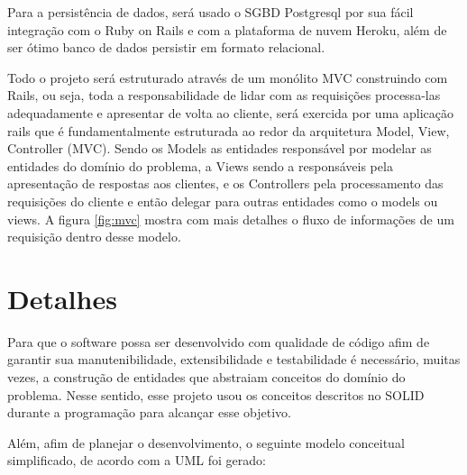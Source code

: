 Para a persistência de dados, será usado o SGBD Postgresql \cite{postgresql} por sua fácil integração com o Ruby on Rails e com a plataforma de nuvem Heroku, além de ser ótimo banco de dados persistir em formato relacional.

Todo o projeto será estruturado através de um monólito MVC construindo com Rails, ou seja, toda a responsabilidade de lidar com as requisições processa-las adequadamente e apresentar de volta ao cliente, será exercida por uma aplicação rails que é fundamentalmente estruturada ao redor da arquitetura Model, View, Controller (MVC). Sendo os Models as entidades responsável por modelar as entidades do domínio do problema, a Views sendo a responsáveis pela apresentação de respostas aos clientes, e os Controllers pela processamento das requisições do cliente e então delegar para outras entidades como o models ou views. A figura \ref{fig:mvc} mostra com mais detalhes o fluxo de informações de um requisição dentro desse modelo.

\begin{figure}[h!]
  \centering
\end{figure}

\section{Detalhes}

Para que o software possa ser desenvolvido com qualidade de código afim de garantir sua manutenibilidade, extensibilidade e testabilidade é necessário, muitas vezes, a construção de entidades que abstraiam conceitos do domínio do problema. Nesse sentido, esse projeto usou os conceitos descritos no SOLID \cite{solid} durante a programação para alcançar esse objetivo.

Além, afim de planejar o desenvolvimento, o seguinte modelo conceitual simplificado, de acordo com a UML \cite{waslawick} foi gerado:


